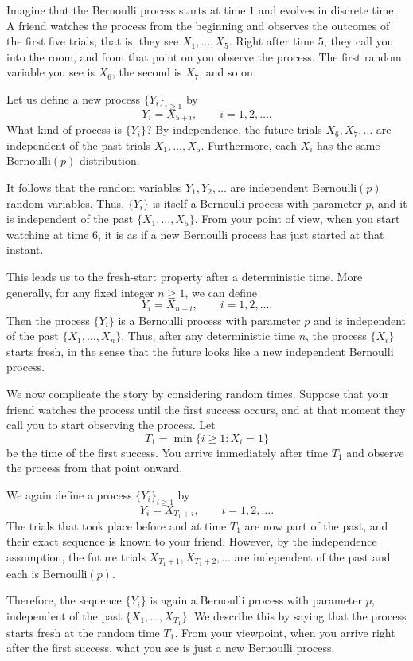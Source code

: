 Imagine that the Bernoulli process starts at time \(1\) and evolves in discrete time.  
A friend watches the process from the beginning and observes the outcomes of the first five trials, that is, they see \(X_1,\ldots,X_5\).  
Right after time \(5\), they call you into the room, and from that point on you observe the process.  
The first random variable you see is \(X_6\), the second is \(X_7\), and so on.  

Let us define a new process \(\{Y_i\}_{i \geq 1}\) by
\[
Y_i = X_{5+i},
\qquad
i = 1,2,\ldots.
\]
What kind of process is \(\{Y_i\}\)?  
By independence, the future trials \(X_6,X_7,\ldots\) are independent of the past trials \(X_1,\ldots,X_5\).  
Furthermore, each \(X_i\) has the same Bernoulli\((p)\) distribution.  

It follows that the random variables \(Y_1,Y_2,\ldots\) are independent Bernoulli\((p)\) random variables.  
Thus, \(\{Y_i\}\) is itself a Bernoulli process with parameter \(p\), and it is independent of the past \(\{X_1,\ldots,X_5\}\).  
From your point of view, when you start watching at time \(6\), it is as if a new Bernoulli process has just started at that instant.  

This leads us to the fresh-start property after a deterministic time.  
More generally, for any fixed integer \(n \geq 1\), we can define
\[
Y_i = X_{n+i},
\qquad
i = 1,2,\ldots.
\]
Then the process \(\{Y_i\}\) is a Bernoulli process with parameter \(p\) and is independent of the past \(\{X_1,\ldots,X_n\}\).  
Thus, after any deterministic time \(n\), the process \(\{X_i\}\) starts fresh, in the sense that the future looks like a new independent Bernoulli process.  

We now complicate the story by considering random times.  
Suppose that your friend watches the process until the first success occurs, and at that moment they call you to start observing the process.  
Let
\[
T_1 = \min\{i \geq 1 : X_i = 1\}
\]
be the time of the first success.  
You arrive immediately after time \(T_1\) and observe the process from that point onward.  

We again define a process \(\{Y_i\}_{i \geq 1}\) by
\[
Y_i = X_{T_1 + i},
\qquad
i = 1,2,\ldots.
\]
The trials that took place before and at time \(T_1\) are now part of the past, and their exact sequence is known to your friend.  
However, by the independence assumption, the future trials \(X_{T_1+1}, X_{T_1+2},\ldots\) are independent of the past and each is Bernoulli\((p)\).  

Therefore, the sequence \(\{Y_i\}\) is again a Bernoulli process with parameter \(p\), independent of the past \(\{X_1,\ldots,X_{T_1}\}\).  
We describe this by saying that the process starts fresh at the random time \(T_1\).  
From your viewpoint, when you arrive right after the first success, what you see is just a new Bernoulli process.  


